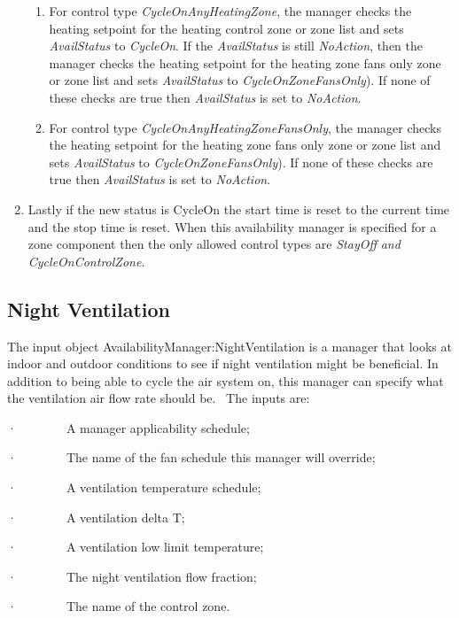 \begin{enumerate}
\begin{enumerate}
  \item  For control type \emph{CycleOnAnyHeatingZone}, the manager checks the heating setpoint for the heating control zone or zone list and sets \emph{AvailStatus} to \emph{CycleOn}. If the \emph{AvailStatus} is still \emph{NoAction}, then the manager checks the heating setpoint for the heating zone fans only zone or zone list and sets \emph{AvailStatus} to \emph{CycleOnZoneFansOnly}). If none of these checks are true then \emph{AvailStatus} is set to \emph{NoAction}.

  \item  For control type \emph{CycleOnAnyHeatingZoneFansOnly}, the manager checks the heating setpoint for the heating zone fans only zone or zone list and sets \emph{AvailStatus} to \emph{CycleOnZoneFansOnly}). If none of these checks are true then \emph{AvailStatus} is set to \emph{NoAction}.

  \end{enumerate}

\item  Lastly if the new status is CycleOn the start time is reset to the current time and the stop time is reset. When this availability manager is specified for a zone component then the only allowed control types are \emph{StayOff} \emph{and} \emph{CycleOnControlZone.}
\end{enumerate}

\subsection{Night Ventilation}\label{night-ventilation}

The input object AvailabilityManager:NightVentilation is a manager that looks at indoor and outdoor conditions to see if night ventilation might be beneficial. In addition to being able to cycle the air system on, this manager can specify what the ventilation air flow rate should be.~ The inputs are:

·~~~~~~~~A manager applicability schedule;

·~~~~~~~~The name of the fan schedule this manager will override;

·~~~~~~~~A ventilation temperature schedule;

·~~~~~~~~A ventilation delta T;

·~~~~~~~~A ventilation low limit temperature;

·~~~~~~~~The night ventilation flow fraction;

·~~~~~~~~The name of the control zone.

